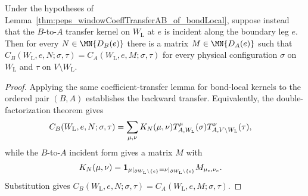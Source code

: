 \begin{lemma}
    \label{thm:peps_windowCoeffTransferBA_of_bondLocal}
    \leanok
    Under the hypotheses of
    Lemma~\ref{thm:peps_windowCoeffTransferAB_of_bondLocal}, suppose instead
    that the $B$-to-$A$ transfer kernel on $W_{\mathrm L}$ at $e$ is incident
    along the boundary leg $e$. Then for every $N\in\MN{D_B(e)}$ there is a
    matrix $M\in\MN{D_A(e)}$ such that
    $C_B(W_{\mathrm L},e,N;\sigma,\tau)
        =C_A(W_{\mathrm L},e,M;\sigma,\tau)$
    for every physical configuration $\sigma$ on $W_{\mathrm L}$ and $\tau$
    on $V\setminus W_{\mathrm L}$.
\end{lemma}
\begin{proof}
    \leanok
    Applying the same coefficient-transfer lemma for bond-local kernels to the
    ordered pair $(B,A)$ establishes the backward transfer. Equivalently, the double-factorization theorem gives
    \begin{align}
        C_B(W_{\mathrm L},e,N;\sigma,\tau)
         & =
        \sum_{\mu,\nu}
        K_N(\mu,\nu)
        T_{A,W_{\mathrm L}}^{\mu}(\sigma)
        T_{A,V\setminus W_{\mathrm L}}^{\nu}(\tau), \notag
    \end{align}
    while the $B$-to-$A$ incident form gives a matrix $M$ with
    \begin{align}
        K_N(\mu,\nu)
         & =
        \mathbf 1_{\mu|_{\partial W_{\mathrm L}\setminus\{e\}}
                =\nu|_{\partial W_{\mathrm L}\setminus\{e\}}}
        M_{\mu_e,\nu_e}. \notag
    \end{align}
    Substitution gives
    $C_B(W_{\mathrm L},e,N;\sigma,\tau)
        =C_A(W_{\mathrm L},e,M;\sigma,\tau)$.
\end{proof}

